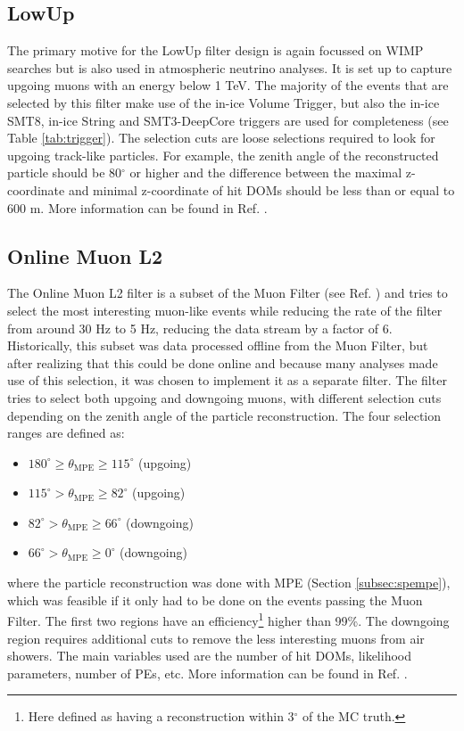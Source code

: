 
\subsection{LowUp}
The primary motive for the LowUp filter design is again focussed on WIMP searches but is also used in atmospheric neutrino analyses. It is set up to capture upgoing muons with an energy below 1 TeV. The majority of the events that are selected by this filter make use of the in-ice Volume Trigger, but also the in-ice SMT8, in-ice String and SMT3-DeepCore triggers are used for completeness (see Table \ref{tab:trigger}). The selection cuts are loose selections required to look for upgoing track-like particles. For example, the zenith angle of the reconstructed particle should be 80$^\circ$ or higher and the difference between the maximal z-coordinate and minimal z-coordinate of hit DOMs should be less than or equal to 600 m. More information can be found in Ref. \cite{LowUp2012}.


\subsection{Online Muon L2}
The Online Muon L2 filter is a subset of the Muon Filter (see Ref. \cite{muon2012filter}) and tries to select the most interesting muon-like events while reducing the rate of the filter from around 30 Hz to 5 Hz, reducing the data stream by a factor of 6. Historically, this subset was data processed offline from the Muon Filter, but after realizing that this could be done online and because many analyses made use of this selection, it was chosen to implement it as a separate filter. The filter tries to select both upgoing and downgoing muons, with different selection cuts depending on the zenith angle of the particle reconstruction. The four selection ranges are defined as:
\vspace{2mm}
\begin{itemize}
\item $180^\circ \geq \theta_\textrm{MPE} \geq 115^\circ$ (upgoing)
\item $115^\circ > \theta_\textrm{MPE} \geq 82^\circ$ (upgoing)
\item $82^\circ > \theta_\textrm{MPE} \geq 66^\circ$ (downgoing)
\item $66^\circ > \theta_\textrm{MPE} \geq 0^\circ$ (downgoing)
\end{itemize}
\vspace{2mm}
where the particle reconstruction was done with MPE (Section \ref{subsec:spempe}), which was feasible if it only had to be done on the events passing the Muon Filter. The first two regions have an efficiency\footnote{Here defined as having a reconstruction within 3$^\circ$ of the MC truth.} higher than 99\%. The downgoing region requires additional cuts to remove the less interesting muons from air showers. The main variables used are the number of hit DOMs, likelihood parameters, number of PEs, etc. More information can be found in Ref. \cite{OnlineMuonL22012}.

